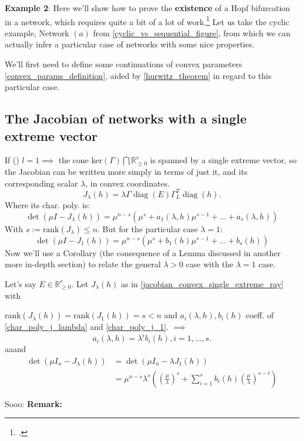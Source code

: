 \textbf{Example 2}:
Here we'll show how to prove the \textbf{existence} of a Hopf bifurcation in a network, which requires quite a bit of a lot of work.\footcite{conradi2024, Suwanmajo2020, Conradi2020} Let us take the cyclic example, Network $(a)$ from \ref{cyclic_vs_sequential_figure}, from which we can actually infer a particular case of networks with some nice properties.

We'll first need to define some continuations of convex parameters \ref{convex_params_definition}, aided by \ref{hurwitz_theorem} in regard to this particular case.

\hfill\break
\subsection{The Jacobian of networks with a single extreme vector}\label{jacobian_single_extreme_vector}

If () $l = 1 \implies$ the cone ker$(\Gamma) \bigcap \mathbb{R}^r_{\geq 0}$ is spanned by a single extreme vector, so the Jacobian can be written more simply in terms of just it, and its corresponding scalar $\lambda$, in convex coordinates.
\begin{equation}\label{jacobian_convex_single_extreme_ray}
	J_\lambda(h)=\lambda \Gamma \operatorname{diag}(E)\Gamma_L^T\operatorname{diag}(h).
\end{equation}
Where its char. poly. is:
\begin{equation}\label{char_poly_j_lambda}
	\det(\mu I-J_\lambda(h))=\mu^{n-s}(\mu^s+a_1(\lambda,h)\mu^{s-1}+\ldots+a_s(\lambda,h))
\end{equation}
With $s := \text{rank}(J_\lambda) \leq n$.
But for the particular case $\lambda = 1$:
\begin{equation}\label{char_poly_j_1}
	\det(\mu I-J_1(h))=\mu^{n-s}(\mu^s+b_1(h)\mu^{s-1}+\ldots+b_s(h))
\end{equation}
Now we'll use a Corollary (the consequence of a Lemma discussed in another more in-depth section) to relate the general $\lambda > 0$ case with the $\lambda = 1$ case.
\begin{corollary}
	Let's say $E \in \mathbb{R}^r_{\geq 0}$. Let $J_\lambda(h)$ as in \ref{jacobian_convex_single_extreme_ray} with

	rank$(J_{\lambda}(h))=\mathrm{rank}(J_{1}(h))=s<n$ and $a_i(\lambda,h), b_i(h)$ coeff. of \ref{char_poly_j_lambda} and \ref{char_poly_j_1}. $\implies$
	\begin{equation}\label{colorally_jacobians_1st_satisfaction}
		a_i(\lambda,h)=\lambda^ib_i(h),i=1,\ldots,s.
	\end{equation}
	aaand
	\begin{equation}\label{colorally_jacobians_2nd_satisfaction}
		\begin{aligned}\det(\mu I_n-J_\lambda(h))&=\det(\mu I_n-\lambda J_1(h))\\&=\mu^{n-s}\lambda^s\left(\left(\frac{\mu}{\lambda}\right)^s+\sum_{i=1}^sb_i(h)\left(\frac{\mu}{\lambda}\right)^{s-i}\right)
		\end{aligned}
	\end{equation}
\end{corollary}
Sooo: \textbf{Remark: }

